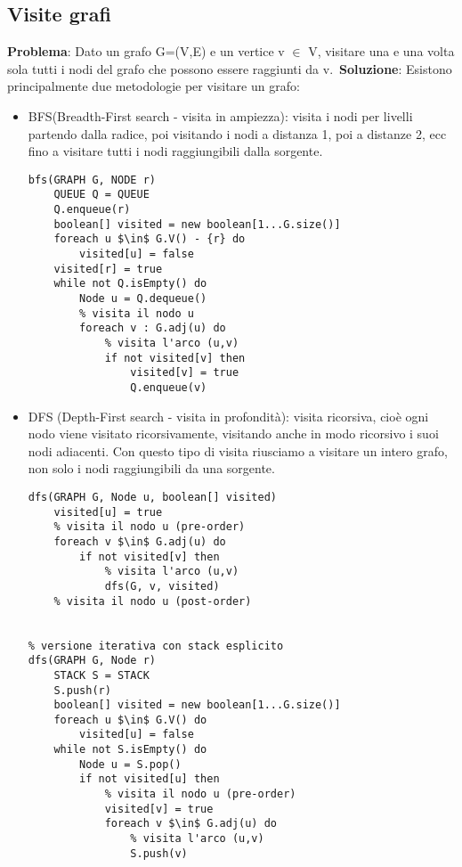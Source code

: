 \documentclass[../cheatSheetAlgoritmi.tex]{subfiles}
\begin{document}
\subsection{Visite grafi}
\textbf{Problema}: Dato un grafo G=(V,E) e un vertice v $\in$ V,
visitare una e una volta sola tutti i nodi del grafo che possono essere raggiunti da v.\
\textbf{Soluzione}: Esistono principalmente due metodologie per visitare un grafo:\
\begin{itemize}
\item BFS(Breadth-First search - visita in ampiezza): visita i nodi per livelli partendo dalla radice, poi visitando i nodi a distanza 1, poi a distanze 2, ecc fino a visitare tutti i nodi raggiungibili dalla sorgente.
\begin{lstlisting}[caption= Visita BFS]
bfs(GRAPH G, NODE r)
	QUEUE Q = QUEUE
	Q.enqueue(r)
	boolean[] visited = new boolean[1...G.size()]
	foreach u $\in$ G.V() - {r} do
		visited[u] = false
	visited[r] = true
	while not Q.isEmpty() do
		Node u = Q.dequeue()
		% visita il nodo u
		foreach v : G.adj(u) do
			% visita l'arco (u,v)
			if not visited[v] then
				visited[v] = true
				Q.enqueue(v)

\end{lstlisting}
	\item DFS (Depth-First search - visita in profondità): visita ricorsiva, cioè ogni nodo viene visitato ricorsivamente, visitando anche in modo ricorsivo i suoi nodi adiacenti. Con questo tipo di visita riusciamo a visitare un intero grafo, non solo i nodi raggiungibili da una sorgente.
\begin{lstlisting}[caption= Visita DFS]
% versione ricorsiva con stack implicito
dfs(GRAPH G, Node u, boolean[] visited)
	visited[u] = true
	% visita il nodo u (pre-order)
	foreach v $\in$ G.adj(u) do
		if not visited[v] then
			% visita l'arco (u,v)
			dfs(G, v, visited)
	% visita il nodo u (post-order)


% versione iterativa con stack esplicito
dfs(GRAPH G, Node r)
	STACK S = STACK
	S.push(r)
	boolean[] visited = new boolean[1...G.size()]
	foreach u $\in$ G.V() do
		visited[u] = false
	while not S.isEmpty() do
		Node u = S.pop()
		if not visited[u] then
			% visita il nodo u (pre-order)
			visited[v] = true
			foreach v $\in$ G.adj(u) do
				% visita l'arco (u,v)
				S.push(v)
\end{lstlisting}
\end{itemize}
\newpage
\end{document}
